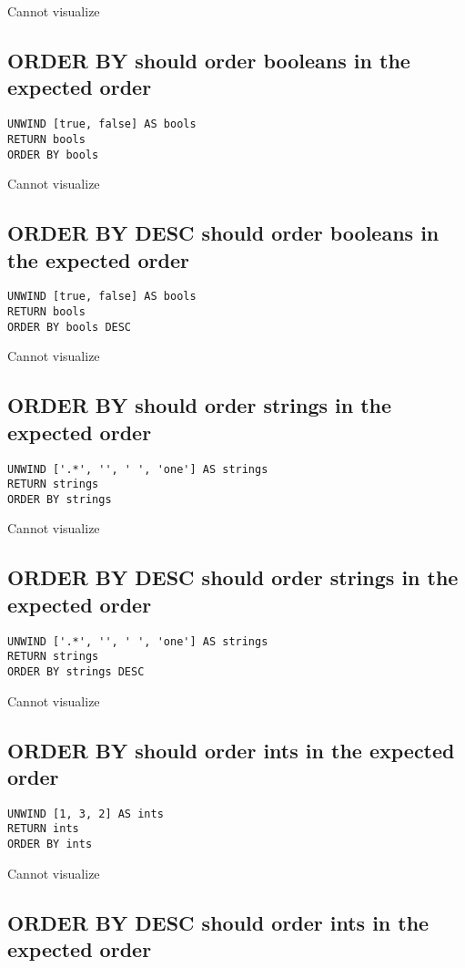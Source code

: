 Cannot visualize
\subsection{ORDER BY should order booleans in the expected order}

\begin{lstlisting}
UNWIND [true, false] AS bools
RETURN bools
ORDER BY bools
\end{lstlisting}

Cannot visualize
\subsection{ORDER BY DESC should order booleans in the expected order}

\begin{lstlisting}
UNWIND [true, false] AS bools
RETURN bools
ORDER BY bools DESC
\end{lstlisting}

Cannot visualize
\subsection{ORDER BY should order strings in the expected order}

\begin{lstlisting}
UNWIND ['.*', '', ' ', 'one'] AS strings
RETURN strings
ORDER BY strings
\end{lstlisting}

Cannot visualize
\subsection{ORDER BY DESC should order strings in the expected order}

\begin{lstlisting}
UNWIND ['.*', '', ' ', 'one'] AS strings
RETURN strings
ORDER BY strings DESC
\end{lstlisting}

Cannot visualize
\subsection{ORDER BY should order ints in the expected order}

\begin{lstlisting}
UNWIND [1, 3, 2] AS ints
RETURN ints
ORDER BY ints
\end{lstlisting}

Cannot visualize
\subsection{ORDER BY DESC should order ints in the expected order}

